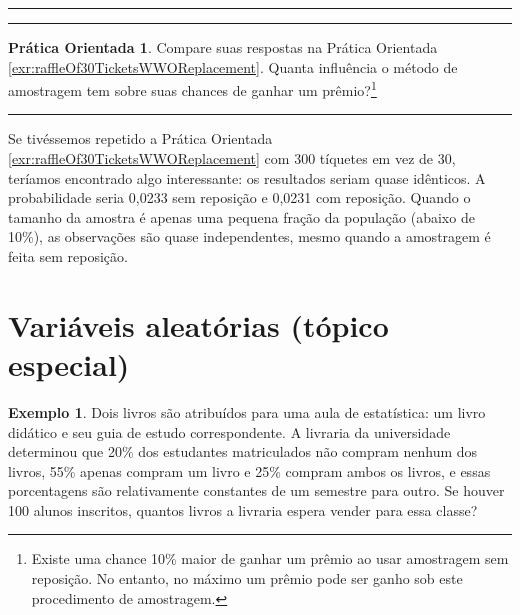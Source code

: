 \documentclass[
]{book}
\theoremstyle{definition}
\theoremstyle{definition}
\newtheorem{example}{Exemplo}[chapter]
\theoremstyle{definition}
\newtheorem{exercise}{Prática Orientada}[chapter]
\theoremstyle{definition}
\theoremstyle{remark}
\begin{document}
\begin{center}\rule{0.5\linewidth}{0.5pt}\end{center}

\begin{center}\rule{0.5\linewidth}{0.5pt}\end{center}

\begin{exercise}
\protect\hypertarget{exr:followUpToRaffleOf30TicketsWWOReplacement}{}{\label{exr:followUpToRaffleOf30TicketsWWOReplacement} }Compare suas respostas na Prática Orientada \ref{exr:raffleOf30TicketsWWOReplacement}. Quanta influência o método de amostragem tem sobre suas chances de ganhar um prêmio?\footnote{Existe uma chance 10\% maior de ganhar um prêmio ao usar amostragem sem reposição. No entanto, no máximo um prêmio pode ser ganho sob este procedimento de amostragem.}
\end{exercise}

\begin{center}\rule{0.5\linewidth}{0.5pt}\end{center}

Se tivéssemos repetido a Prática Orientada \ref{exr:raffleOf30TicketsWWOReplacement} com 300 tíquetes em vez de 30, teríamos encontrado algo interessante: os resultados seriam quase idênticos. A probabilidade seria 0,0233 sem reposição e 0,0231 com reposição. Quando o tamanho da amostra é apenas uma pequena fração da população (abaixo de 10\%), as observações são quase independentes, mesmo quando a amostragem é feita sem reposição.

\hypertarget{randomVariablesSection}{%
\section{Variáveis aleatórias (tópico especial)}\label{randomVariablesSection}}

\begin{example}
\protect\hypertarget{exm:bookStoreSales}{}{\label{exm:bookStoreSales} }Dois livros são atribuídos para uma aula de estatística: um livro didático e seu guia de estudo correspondente. A livraria da universidade determinou que 20\% dos estudantes matriculados não compram nenhum dos livros, 55\% apenas compram um livro e 25\% compram ambos os livros, e essas porcentagens são relativamente constantes de um semestre para outro. Se houver 100 alunos inscritos, quantos livros a livraria espera vender para essa classe?
\end{example}
\end{document}
